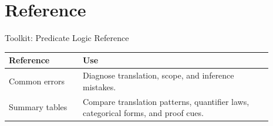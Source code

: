 \section{Reference}

\begin{toolkitbox}{Toolkit: Predicate Logic Reference}
\small
\begin{tabular}{p{0.25\linewidth} p{0.64\linewidth}}
\toprule
\textbf{Reference} & \textbf{Use} \\
\midrule
Common errors & Diagnose translation, scope, and inference mistakes. \\
Summary tables & Compare translation patterns, quantifier laws, categorical forms, and proof cues. \\
\bottomrule
\end{tabular}
\end{toolkitbox}





